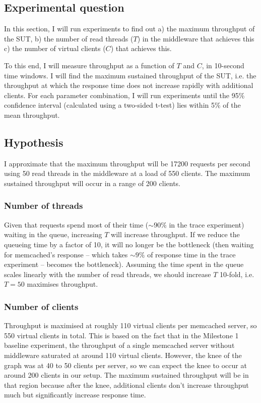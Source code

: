 \documentclass[11pt]{article}
\begin{document}
\subsection{Experimental question}

In this section, I will run experiments to find out a) the maximum throughput of the SUT, b) the number of read threads ($T$) in the middleware that achieves this c) the number of virtual clients ($C$) that achieves this.

To this end, I will measure throughput as a function of $T$ and $C$, in 10-second time windows. I will find the maximum sustained throughput of the SUT, i.e. the throughput at which the response time does not increase rapidly with additional clients. For each parameter combination, I will run experiments until the 95\% confidence interval (calculated using a two-sided t-test) lies within 5\% of the mean throughput.

\subsection{Hypothesis}

I approximate that the maximum throughput will be 17200 requests per second using 50 read threads in the middleware at a load of 550 clients. The maximum sustained throughput will occur in a range of 200 clients.

\subsubsection{Number of threads} 
Given that requests spend most of their time ($\sim90\%$ in the trace experiment) waiting in the queue, increasing $T$ will increase throughput. If we reduce the queueing time by a factor of 10, it will no longer be the bottleneck (then waiting for memcached's response -- which takes $\sim9\%$ of response time in the trace experiment -- becomes the bottleneck). Assuming the time spent in the queue scales linearly with the number of read threads, we should increase $T$ 10-fold, i.e. $T=50$ maximises throughput.

\subsubsection{Number of clients}
Throughput is maximised at roughly 110 virtual clients per memcached server, so 550 virtual clients in total. This is based on the fact that in the Milestone 1 baseline experiment, the throughput of a single memcached server without middleware saturated at around 110 virtual clients. However, the knee of the graph was at 40 to 50 clients per server, so we can expect the knee to occur at around 200 clients in our setup. The maximum sustained throughput will be in that region because after the knee, additional clients don't increase throughput much but significantly increase response time.
\end{document}

